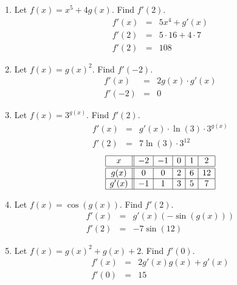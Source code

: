 \documentclass[11pt]{article}
\begin{document}
\begin{enumerate}
  \begin{enumerate}
  \item Let $f(x)=x^5+4g(x)$. Find $f'(2)$.
    \vfill
    \[
    \begin{array}{rcl}
      f'(x)&=&5x^4+g'(x)\\
      f'(2)&=&5\cdot 16+4\cdot 7\\
      f'(2)&=&108
    \end{array}
    \]
    \vfill
  \item Let $f(x)=g(x)^2$. Find $f'(-2)$.
    \vfill
    \[
    \begin{array}{rcl}
      f'(x)&=&2g(x)\cdot g'(x)\\
      f'(-2)&=&0
    \end{array}
    \]
    \vfill
  \item Let $f(x)=3^{g(x)}$. Find $f'(2)$.
    \vfill
    \[
    \begin{array}{rcl}
      f'(x)&=&g'(x)\cdot\ln(3)\cdot 3^{g(x)}\\
      f'(2)&=&7\ln(3)\cdot 3^{12}
    \end{array}
    \]
    \vfill
    \newpage
    \[
    \begin{array}{|c||c|c|c|c|c|}
      \hline
      x&-2&-1&0&1&2\\
      \hline
      \hline
      g(x)&0&0&2&6&12\\
      \hline
      g'(x)&-1&1&3&5&7\\
      \hline
    \end{array}
    \]
  \item Let $f(x)=\cos(g(x))$. Find $f'(2)$.
    \vfill
    \[
    \begin{array}{rcl}
      f'(x)&=&g'(x)(-\sin(g(x)))\\
      f'(2)&=&-7\sin(12)
    \end{array}
    \]
    \vfill
  \item Let $f(x)=g(x)^2+g(x)+2$.  Find $f'(0)$.
    \vfill
    \[
    \begin{array}{rcl}
      f'(x)&=&2g'(x)g(x)+g'(x)\\
      f'(0)&=&15
    \end{array}
    \]
    \vfill

  \end{enumerate}

\end{enumerate}
\end{document}
